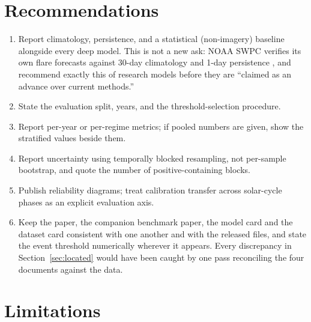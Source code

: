 \documentclass[11pt]{article}
\begin{document}
\section{Recommendations}

\begin{enumerate}
\item Report climatology, persistence, and a statistical (non-imagery) baseline
alongside every deep model. This is not a new ask: NOAA SWPC verifies its own
flare forecasts against 30-day climatology and 1-day persistence
\citep{swpcverif}, and \citet{camporeale2025} recommend exactly this of research
models before they are ``claimed as an advance over current methods.''
\item State the evaluation split, years, and the threshold-selection procedure.
\item Report per-year or per-regime metrics; if pooled numbers are given, show
the stratified values beside them.
\item Report uncertainty using temporally blocked resampling, not per-sample
bootstrap, and quote the number of positive-containing blocks.
\item Publish reliability diagrams; treat calibration transfer across solar-cycle
phases as an explicit evaluation axis.
\item Keep the paper, the companion benchmark paper, the model card and the
dataset card consistent with one another and with the released files, and state
the event threshold numerically wherever it appears. Every discrepancy in
Section~\ref{sec:located} would have been caught by one pass reconciling the four
documents against the data.
\end{enumerate}

\section{Limitations}
\label{sec:limits}
\end{document}
